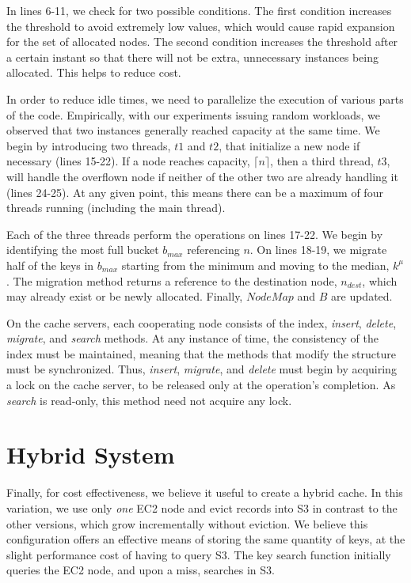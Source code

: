 In lines 6-11, we check for two possible conditions. The first condition
increases the threshold to avoid extremely low values, which would cause rapid
expansion for the set of allocated nodes. The second condition increases the
threshold after a certain instant so that there will not be extra, unnecessary
instances being allocated. This helps to reduce cost.

In order to reduce idle times, we need to parallelize the execution of various
parts of the code. Empirically, with our experiments issuing random workloads,
we observed that two instances generally reached capacity at the same time. We
begin by introducing two threads, $t1$ and $t2$, that initialize a new node if
necessary (lines 15-22). If a node reaches capacity, $\lceil{n}\rceil$, then a
third thread, $t3$, will handle the overflown node if neither of the other two
are already handling it (lines 24-25). At any given point, this means there can
be a maximum of four threads running (including the main thread).

Each of the three threads perform the operations on lines 17-22. We begin by
identifying the most full bucket $b_{max}$ referencing $n$. On lines 18-19, we
migrate half of the keys in $b_{max}$ starting from the minimum and moving to
the median, $k^{\mu}$. The migration method returns a reference to the
destination node, $n_{dest}$, which may already exist or be newly allocated.
Finally, $NodeMap$ and $B$ are updated.

On the cache servers, each cooperating node consists of the index,
\emph{insert}, \emph{delete}, \emph{migrate}, and \emph{search} methods. At any
instance of time, the consistency of the index must be maintained, meaning that
the methods that modify the structure must be synchronized. Thus,
\emph{insert}, \emph{migrate}, and \emph{delete} must begin by acquiring a lock
on the cache server, to be released only at the operation's completion. As
\emph{search} is read-only, this method need not acquire any lock.


\section{Hybrid System} %
\label{sec:hybrid_system}
Finally, for cost effectiveness, we believe it useful to create a hybrid cache.
In this variation, we use only \emph{one} EC2 node and evict records into S3 in
contrast to the other versions, which grow incrementally without eviction. We
believe this configuration offers an effective means of storing the same
quantity of keys, at the slight performance cost of having to query S3. The key
search function initially queries the EC2 node, and upon a miss, searches in
S3.

